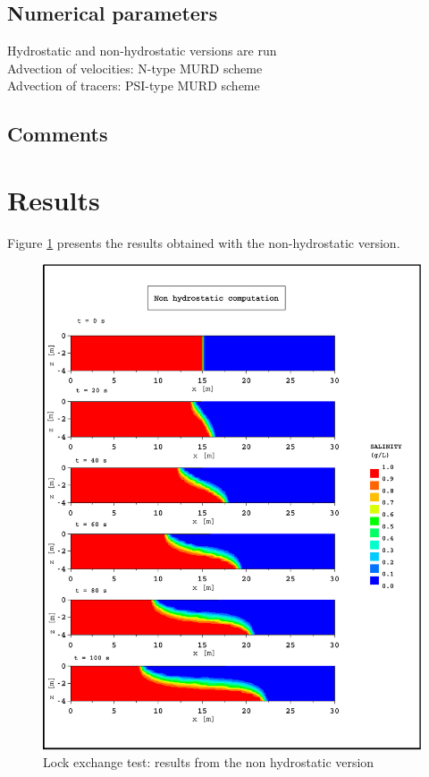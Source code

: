 \subsection{Numerical parameters}
%
Hydrostatic and non-hydrostatic versions are run\\
Advection of velocities: N-type MURD scheme\\
Advection of tracers: PSI-type MURD scheme
%
\subsection{Comments}
%
%
%
\section{Results}
%
Figure \ref{t3d:lock-exchange:NH_res} presents the results obtained with
the non-hydrostatic version.

\begin{figure} [H]
\centering
\includegraphics[scale=0.8]{../img/lock_exchange_NH_res.pdf}
 \caption{Lock exchange test: results from the non hydrostatic version}
 \label{t3d:lock-exchange:NH_res}
\end{figure}

